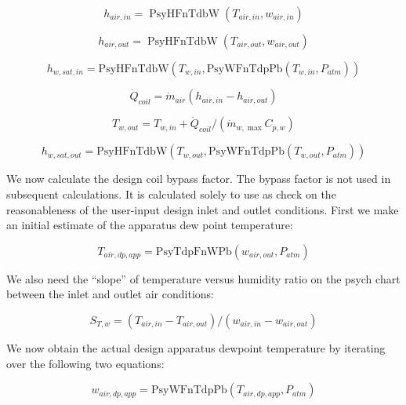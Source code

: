 \begin{equation}
{h_{air,in}} = \operatorname{PsyHFnTdbW} ({T_{air,in}},{w_{air,in}})
\end{equation}

\begin{equation}
{h_{air,out}} = \operatorname{PsyHFnTdbW} ({T_{air,out}},{w_{air,out}})
\end{equation}

\begin{equation}
{h_{w,sat,in}} = {\mathrm{PsyHFnTdbW}}({T_{w,in}},{\mathrm{PsyWFnTdpPb}}({T_{w,in}},{P_{atm}}))
\end{equation}

\begin{equation}
{\dot Q_{coil}} = {\dot m_{air}}({h_{air,in}} - {h_{air,out}})
\end{equation}

\begin{equation}
{T_{w,out}} = {T_{w,in}} + {\dot Q_{coil}}/({\dot m_{w,\max }}{C_{p,w}})
\end{equation}

\begin{equation}
{h_{w,sat,out}} = {\mathrm{PsyHFnTdbW}}({T_{w,out}},{\mathrm{PsyWFnTdpPb}}({T_{w,out}},{P_{atm}}))
\end{equation}

We now calculate the design coil bypass factor. The bypass factor is not used in subsequent calculations. It is calculated solely to use as check on the reasonableness of the user-input design inlet and outlet conditions. First we make an initial estimate of the apparatus dew point temperature:

\begin{equation}
{T_{air,dp,app}} = {\mathrm{PsyTdpFnWPb}}({w_{air,out}},{P_{atm}})
\end{equation}

We also need the ``slope'' of temperature versus humidity ratio on the psych chart between the inlet and outlet air conditions:

\begin{equation}
{S_{T,w}} = ({T_{air,in}} - {T_{air,out}})/({w_{air,in}} - {w_{air,out}})
\end{equation}

We now obtain the actual design apparatus dewpoint temperature by iterating over the following two equations:

\begin{equation}
{w_{air,dp,app}} = {\mathrm{PsyWFnTdpPb}}({T_{air,dp,app}},{P_{atm}})
\end{equation}

